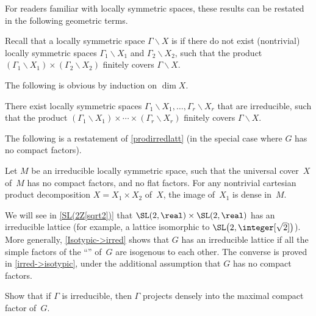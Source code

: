 For readers familiar with locally symmetric spaces, these results can be restated in the following geometric
terms. 

\begin{defn}
 Recall that a locally symmetric space $\Gamma \backslash
X$ is  if there do not exist (nontrivial)
locally symmetric spaces $\Gamma_1 \backslash X_1$ and
$\Gamma_2 \backslash X_2$, such that the product
 $ (\Gamma_1 \backslash X_1) \times (\Gamma_2 \backslash
X_2)$
 finitely covers $\Gamma \backslash X$.
 \end{defn}

The following is obvious by induction on $\dim X$.

\begin{prop}
 There exist locally symmetric spaces\/
 $\Gamma_1 \backslash X_1, \ldots, \Gamma_r \backslash X_r$
 that are irreducible, such
that the product\/
 $ (\Gamma_1 \backslash X_1) \times \cdots \times (\Gamma_r
\backslash X_r)$
 finitely covers $\Gamma \backslash X$.
 \end{prop}

The following is a restatement of
\cref{prodirredlatt} (in the special case where $G$
has no compact factors).

\begin{prop} 
 Let $M$ be an irreducible locally symmetric space, such
that the universal cover~$X$ of~$M$ has no compact
factors, and no flat factors. For any nontrivial cartesian
product decomposition $X = X_1 \times X_2$ of~$X$, the
image of~$X_1$ is dense in~$M$.
 \end{prop}

We will see in \cref{SL(2Z[sqrt2])} that
$\SL(2,\real) \times \SL(2,\real)$ has an irreducible
lattice (for example, a lattice isomorphic to
$\SL\bigl( 2,\integer[\sqrt{2}] \bigr)$). 
More generally, \cref{Isotypic->irred} shows
that $G$ has an irreducible lattice if all the simple factors of the ``'' of~$G$ are isogenous to each other. The converse is proved in \cref{irred->isotypic}, under the additional assumption that $G$ has no compact factors.

\begin{exercises}

\item \label{irred->CpctFactor}
 Show that if $\Gamma$ is irreducible, %
then $\Gamma$ projects densely into the maximal
compact factor of~$G$.

\end{exercises}



